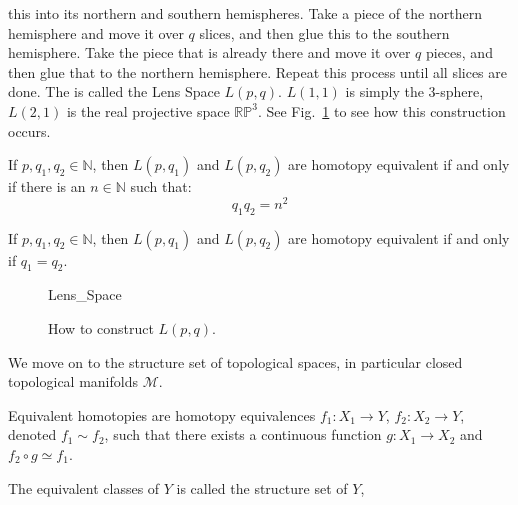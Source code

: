 \documentclass[crop=false,class=book,oneside]{standalone}                      %
\begin{document}
            this into its northern and southern hemispheres.
            Take a piece of the northern hemisphere and move
            it over $q$ slices, and then glue this to the
            southern hemisphere. Take the piece that is already
            there and move it over $q$ pieces, and then glue
            that to the northern hemisphere. Repeat this
            process until all slices are done. The is called
            the Lens Space $L(p,q)$. $L(1,1)$ is simply the
            3-sphere, $L(2,1)$ is the real projective space
            $\mathbb{RP}^{3}$.
            See Fig.~\ref{fig:surgery_theory_lens_space_drawing}
            to see how this construction occurs.
            \begin{theorem}
                If $p,q_{1},q_{2}\in\mathbb{N}$, then $L(p,q_{1})$ and
                $L(p,q_{2})$ are homotopy equivalent if and only if there
                is an $n\in\mathbb{N}$ such that:
                \begin{equation}
                    q_{1}q_{2}=n^{2}
                \end{equation}
            \end{theorem}
            \begin{theorem}
                If $p,q_{1},q_{2}\in\mathbb{N}$, then $L(p,q_{1})$ and
                $L(p,q_{2})$ are homotopy equivalent if and only if
                $q_{1}=q_{2}$.
            \end{theorem}
            \begin{figure}[H]
                \centering
                \captionsetup{type=figure}
                {Lens_Space}
                \caption{How to construct $L(p,q)$.}
                \label{fig:surgery_theory_lens_space_drawing}
            \end{figure}
            We move on to the structure set of topological spaces,
            in particular closed topological
            manifolds $\mathcal{M}$.
            \begin{definition}
                Equivalent homotopies are homotopy equivalences
                $f_{1}:X_{1}\rightarrow Y$,
                $f_{2}:X_{2}\rightarrow Y$,
                denoted $f_{1}\sim{f_{2}}$, such that there
                exists a continuous function
                $g:X_{1}\rightarrow{X_{2}}$ and
                $f_{2}\circ{g}\simeq{f_{1}}$.
            \end{definition}
            The equivalent classes of $Y$ is called the
            structure set of $Y$,
\end{document}
